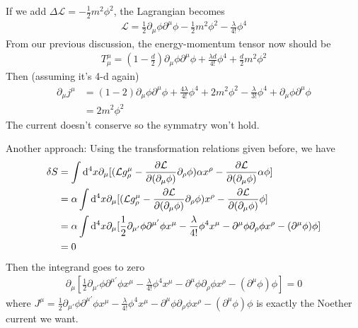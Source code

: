 \documentclass{article}
\newcommand{\lag}{\mathcal{L}}
\begin{document}
If we add $\Delta\mathcal{L}=-\frac{1}{2}m^2\phi^2$, the Lagrangian becomes
\begin{align}
  \lag=\frac{1}{2}\partial_{\mu}\phi\partial^{\mu}\phi-\frac{1}{2}m^2\phi^2-\frac{\lambda}{4!}\phi^4
\end{align}
From our previous discussion, the energy-momentum tensor now should be
\begin{align*}
    T^{\mu}_{\mu}=(1-\frac{d}{2})\partial_{\mu}\phi\partial^{\mu}\phi+\frac{\lambda d}{4!}\phi^4+\frac{d}{2}m^2\phi^2
\end{align*}
Then (assuming it's 4-d again)
\begin{align*}
  \partial_{\mu}j^{\mu}&=(1-2)\partial_{\mu}\phi\partial^{\mu}\phi+\frac{4\lambda }{4!}\phi^4+2m^2\phi^2-\frac{\lambda}{3!}\phi^4+\partial_{\mu}\phi\partial^{\mu}\phi\\
  &=2m^2\phi^2
\end{align*}
The current doesn't conserve so the symmatry won't hold.


Another approach: Using the transformation relations given before, we have
\begin{align*}
  \delta S&=\int\dd^4x\partial_{\mu}[(\mathcal{L}g^{\mu}_{\rho}-\pdv{\mathcal{L}}{(\partial_{\mu}\phi)}\partial_{\rho}\phi)\alpha x^{\rho}-\pdv{\mathcal{L}}{(\partial_{\mu}\phi)}\alpha\phi]\\
  &=\alpha\int\dd^4x\partial_{\mu}[(\mathcal{L}g^{\mu}_{\rho}-\pdv{\mathcal{L}}{(\partial_{\mu}\phi)}\partial_{\rho}\phi)x^{\rho}-\pdv{\mathcal{L}}{(\partial_{\mu}\phi)}\phi]\\
  &=\alpha\int\dd^4x\partial_{\mu}[\frac{1}{2}\partial_{\mu'}\phi\partial^{\mu'}\phi  x^{\mu}-\frac{\lambda}{4!}\phi^4x^{\mu}-\partial^{\mu}\phi\partial_{\rho}\phi x^{\rho}-(\partial^{\mu}\phi)\phi]\\
  &=0
\end{align*}
Then the integrand goes to zero
\begin{align*}
  \partial_{\mu}[\frac{1}{2}\partial_{\mu'}\phi\partial^{\mu'}\phi  x^{\mu}-\frac{\lambda}{4!}\phi^4x^{\mu}-\partial^{\mu}\phi\partial_{\rho}\phi x^{\rho}-(\partial^{\mu}\phi)\phi]=0
\end{align*}
where $J^{\mu}=\frac{1}{2}\partial_{\mu'}\phi\partial^{\mu'}\phi  x^{\mu}-\frac{\lambda}{4!}\phi^4x^{\mu}-\partial^{\mu}\phi\partial_{\rho}\phi x^{\rho}-(\partial^{\mu}\phi)\phi$ is exactly the Noether current we want.
\end{document}
